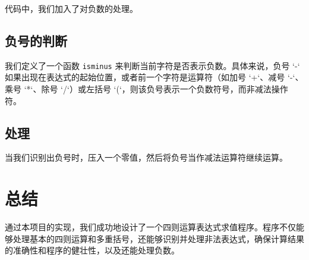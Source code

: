 \documentclass[UTF8]{ctexart}
\begin{document}
代码中，我们加入了对负数的处理。

\subsection{负号的判断}

我们定义了一个函数 \texttt{isminus} 来判断当前字符是否表示负数。具体来说，负号 `-` 如果出现在表达式的起始位置，或者前一个字符是运算符（如加号 `+`、减号 `-`、乘号 `*`、除号 `/`）或左括号 `(`，则该负号表示一个负数符号，而非减法操作符。


\subsection{处理}

当我们识别出负号时，压入一个零值，然后将负号当作减法运算符继续运算。




\section{总结}

通过本项目的实现，我们成功地设计了一个四则运算表达式求值程序。程序不仅能够处理基本的四则运算和多重括号，还能够识别并处理非法表达式，确保计算结果的准确性和程序的健壮性，以及还能处理负数。
\end{document}
